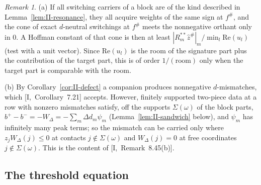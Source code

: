 \documentclass[10pt]{amsart}
\theoremstyle{definition}
\theoremstyle{remark}
\newtheorem{remark}[theorem]{Remark}
\newcommand{\zh}{\hat z}
\begin{document}
\begin{remark}\label{rem:II-resonance}
(a) If all switching carriers of a block are of the kind described in
Lemma~\ref{lem:II-resonance}, they all acquire weights of the same sign at
$f^\#$, and the cone of exact $d$-neutral switchings at $f^\#$ meets the
nonnegative orthant only in $0$.  A Hoffman constant of that cone is then
at least $|R_m^{**}\zh^\#|_m/\min_l\mathrm{Re}(u_l)$ (test with a unit
vector).  Since $\mathrm{Re}(u_l)$ is the room of the signature part plus
the contribution of the target part, this is of order $1/(\text{room})$
only when the target part is comparable with the room.

(b) By Corollary~\ref{cor:II-defect} a companion produces nonnegative
$d$-mismatches, which [I,~Corollary~7.21] accepts.  However, finitely
supported two-piece data at a row with nonzero mismatches satisfy, off the
supports $\Sigma(\omega)$ of the block parts, $b^+-b^-=-W_\Delta=-\sum_m
\Delta d_m\psi_m$ (Lemma~\ref{lem:II-sandwich} below), and $\psi_m$ has
infinitely many peak terms; so the mismatch can be carried only where
$z_jW_\Delta(j)\le0$ at contacts $j\notin\Sigma(\omega)$ and $W_\Delta(j)=0$
at free coordinates $j\notin\Sigma(\omega)$.  This is the content of [I,~Remark~8.45(b)].
\end{remark}

\subsection{The threshold equation}\label{subsec:II-threshold}
\end{document}
